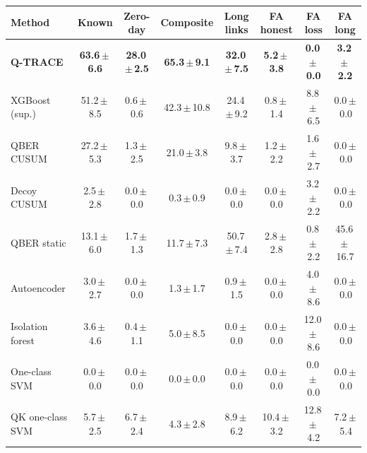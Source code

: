 \begin{tabular}{lccccccc}
\toprule
Method & Known & Zero-day & Composite & Long links & FA honest & FA loss & FA long \\
\midrule
\textbf{Q-TRACE} & \textbf{63.6\,$\pm$\,6.6} & \textbf{28.0\,$\pm$\,2.5} & \textbf{65.3\,$\pm$\,9.1} & \textbf{32.0\,$\pm$\,7.5} & \textbf{5.2\,$\pm$\,3.8} & \textbf{0.0\,$\pm$\,0.0} & \textbf{3.2\,$\pm$\,2.2} \\
XGBoost (sup.) & 51.2\,$\pm$\,8.5 & 0.6\,$\pm$\,0.6 & 42.3\,$\pm$\,10.8 & 24.4\,$\pm$\,9.2 & 0.8\,$\pm$\,1.4 & 8.8\,$\pm$\,6.5 & 0.0\,$\pm$\,0.0 \\
QBER CUSUM & 27.2\,$\pm$\,5.3 & 1.3\,$\pm$\,2.5 & 21.0\,$\pm$\,3.8 & 9.8\,$\pm$\,3.7 & 1.2\,$\pm$\,2.2 & 1.6\,$\pm$\,2.7 & 0.0\,$\pm$\,0.0 \\
Decoy CUSUM & 2.5\,$\pm$\,2.8 & 0.0\,$\pm$\,0.0 & 0.3\,$\pm$\,0.9 & 0.0\,$\pm$\,0.0 & 0.0\,$\pm$\,0.0 & 3.2\,$\pm$\,2.2 & 0.0\,$\pm$\,0.0 \\
QBER static & 13.1\,$\pm$\,6.0 & 1.7\,$\pm$\,1.3 & 11.7\,$\pm$\,7.3 & 50.7\,$\pm$\,7.4 & 2.8\,$\pm$\,2.8 & 0.8\,$\pm$\,2.2 & 45.6\,$\pm$\,16.7 \\
Autoencoder & 3.0\,$\pm$\,2.7 & 0.0\,$\pm$\,0.0 & 1.3\,$\pm$\,1.7 & 0.9\,$\pm$\,1.5 & 0.0\,$\pm$\,0.0 & 4.0\,$\pm$\,8.6 & 0.0\,$\pm$\,0.0 \\
Isolation forest & 3.6\,$\pm$\,4.6 & 0.4\,$\pm$\,1.1 & 5.0\,$\pm$\,8.5 & 0.0\,$\pm$\,0.0 & 0.0\,$\pm$\,0.0 & 12.0\,$\pm$\,8.6 & 0.0\,$\pm$\,0.0 \\
One-class SVM & 0.0\,$\pm$\,0.0 & 0.0\,$\pm$\,0.0 & 0.0\,$\pm$\,0.0 & 0.0\,$\pm$\,0.0 & 0.0\,$\pm$\,0.0 & 0.0\,$\pm$\,0.0 & 0.0\,$\pm$\,0.0 \\
QK one-class SVM & 5.7\,$\pm$\,2.5 & 6.7\,$\pm$\,2.4 & 4.3\,$\pm$\,2.8 & 8.9\,$\pm$\,6.2 & 10.4\,$\pm$\,3.2 & 12.8\,$\pm$\,4.2 & 7.2\,$\pm$\,5.4 \\
\bottomrule
\end{tabular}

